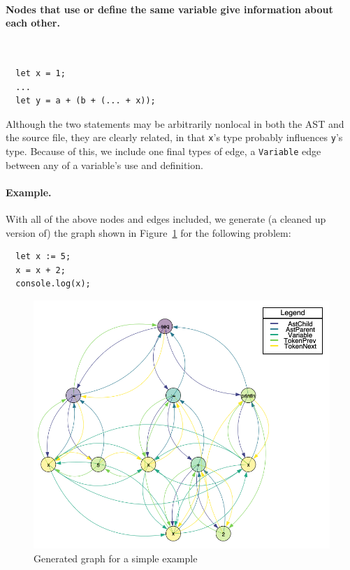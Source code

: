 \paragraph{Nodes that use or define the same variable give information about each other.}
\ %
\begin{lstlisting}
  let x = 1;
  ...
  let y = a + (b + (... + x));
\end{lstlisting}
Although the two statements may be arbitrarily nonlocal in both the AST and the source file, they are clearly related, in that \texttt{x}'s type probably influences \texttt{y}'s type.
Because of this, we include one final types of edge, a \texttt{Variable} edge between any of a variable's use and definition.

\paragraph{Example.}
With all of the above nodes and edges included, we generate (a cleaned up version of) the graph shown in Figure~\ref{fig:ast-graph} for the following problem:
\begin{lstlisting}
  let x := 5;
  x = x + 2;
  console.log(x);
\end{lstlisting}

\begin{figure}
  \centering
  \includegraphics[width=\linewidth]{img/gen_graph}
  \caption{Generated graph for a simple example}
  \label{fig:ast-graph}
\end{figure}


